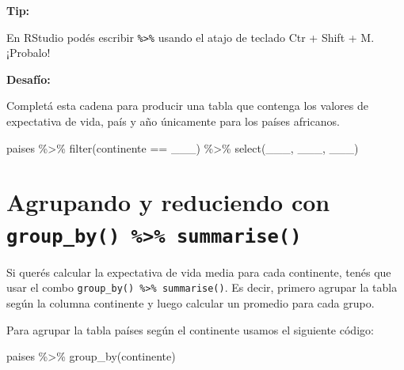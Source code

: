 \documentclass[
  openany]{book}
\newenvironment{Shaded}{\begin{snugshade}}{\end{snugshade}}
\newcommand{\FunctionTok}[1]{\textcolor[rgb]{0.00,0.00,0.00}{#1}}
\newcommand{\NormalTok}[1]{#1}
\newcommand{\SpecialCharTok}[1]{\textcolor[rgb]{0.00,0.00,0.00}{#1}}
\begin{document}
\textbf{Tip:}

En RStudio podés escribir \texttt{\%\textgreater{}\%} usando el atajo de teclado Ctr + Shift + M.
¡Probalo!

\textbf{Desafío:}

Completá esta cadena para producir una tabla que contenga los valores de expectativa de vida, país y año únicamente para los países africanos.

\begin{Shaded}
\begin{Highlighting}[]
\NormalTok{paises }\SpecialCharTok{\%\textgreater{}\%} 
  \FunctionTok{filter}\NormalTok{(continente }\SpecialCharTok{==}\NormalTok{ \_\_\_) }\SpecialCharTok{\%\textgreater{}\%}
  \FunctionTok{select}\NormalTok{(\_\_\_, \_\_\_, \_\_\_)}
\end{Highlighting}
\end{Shaded}

\hypertarget{agrupando-y-reduciendo-con-group_by-summarise}{%
\section{\texorpdfstring{Agrupando y reduciendo con \texttt{group\_by()\ \%\textgreater{}\%\ summarise()}}{Agrupando y reduciendo con group\_by() \%\textgreater\% summarise()}}\label{agrupando-y-reduciendo-con-group_by-summarise}}

Si querés calcular la expectativa de vida media para cada continente, tenés que usar el combo \texttt{group\_by()\ \%\textgreater{}\%\ summarise()}.
Es decir, primero agrupar la tabla según la columna continente y luego calcular un promedio para cada grupo.

Para agrupar la tabla países según el continente usamos el siguiente código:

\begin{Shaded}
\begin{Highlighting}[]
\NormalTok{paises }\SpecialCharTok{\%\textgreater{}\%} 
  \FunctionTok{group\_by}\NormalTok{(continente) }
\end{Highlighting}
\end{Shaded}
\end{document}
